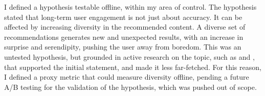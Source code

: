 I defined a hypothesis testable offline, within my area of control.
The hypothesis stated that long-term user engagement is not just about accuracy. It can be affected by increasing diversity in the recommended content.
A diverse set of recommendations generates new and unexpected results, with an increase in surprise and serendipity, pushing the user away from boredom.
This was an untested hypothesis, but grounded in active research on the topic, such as \cite{Kaminskas2016DiversitySN} and
\cite{duricic2023beyondaccuracyreviewdiversityserendipity}, that supported the initial statement, and made it less far-fetched.
For this reason, I defined a proxy metric that could measure diversity offline, pending a future A/B testing for the validation of the hypothesis,
which was pushed out of scope.
